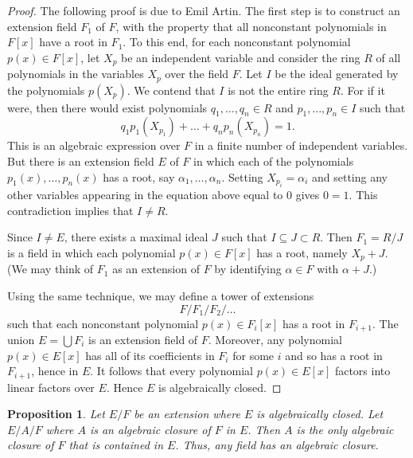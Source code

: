\documentclass[draft]{article}
\newtheorem{prop}[thm]{Proposition}
\theoremstyle{definition}
\theoremstyle{remark}
\begin{document}
            \begin{proof}
                The following proof is due to Emil Artin. The first step is to construct an extension field $F_1$ of $F$, with the property that all nonconstant polynomials in $F[x]$ have a root in $F_1$. To this end, for each nonconstant polynomial $p(x) \in F[x]$, let $X_p$ be an independent variable and consider the ring $R$ of all polynomials in the variables $X_p$ over the field $F$. Let $I$ be the ideal generated by the polynomials $p(X_p)$. We contend that $I$ is not the entire ring $R$. For if it were, then there would exist polynomials $q_1, \dots, q_n \in R$ and $p_1, \dots, p_n \in I$ such that
                \begin{equation*}
                    q_1p_1(X_{p_1}) + \dots + q_np_n(X_{p_n}) = 1.
                \end{equation*}
                This is an algebraic expression over $F$ in a finite number of independent variables. But there is an extension field $E$ of $F$ in which each of the polynomials $p_1(x), \dots, p_n(x)$ has a root, say $\alpha_1, \dots, \alpha_n$. Setting $X_{p_i} = \alpha_i$ and setting any other variables appearing in the equation above equal to $0$ gives $0 = 1$. This contradiction implies that $I \neq R$.\par
                Since $I \neq E$, there exists a maximal ideal $J$ such that $I \subseteq J \subset R$. Then $F_1 = R / J$ is a field in which each polynomial $p(x) \in F[x]$ has a root, namely $X_p + J$. (We may think of $F_1$ as an extension of $F$ by identifying $\alpha \in F$ with $\alpha + J$.)\par
                Using the same technique, we may define a tower of extensions
                \begin{equation*}
                    F / F_1 / F_2 / \dots
                \end{equation*}
                such that each nonconstant polynomial $p(x) \in F_i[x]$ has a root in $F_{i + 1}$. The union $E = \bigcup F_i$ is an extension field of $F$. Moreover, any polynomial $p(x) \in E[x]$ has all of its coefficients in $F_i$ for some $i$ and so has a root in $F_{i + 1}$, hence in $E$. It follows that every polynomial $p(x) \in E[x]$ factors into linear factors over $E$. Hence $E$ is algebraically closed.
                
            \end{proof}
            
            \begin{prop}
                Let $E/F$ be an extension where $E$ is algebraically closed. Let $E/A/F$ where $A$ is an algebraic closure of $F$ in $E$. Then $A$ is the only algebraic closure of $F$ that is contained in $E$. Thus, any field has an algebraic closure.
            \end{prop}
            
\end{document}
